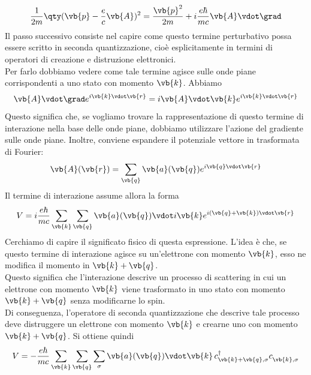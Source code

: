 \begin{equation*}
   \frac{1}{2m}
   \qty(
      \vb{p}
      -
      \frac{e}{c}\vb{A}
   )^2
   =
   \frac{\vb{p}^2}{2m}
   +
   i\frac{e\hbar}{mc}\vb{A}\vdot\grad
\end{equation*}
Il passo successivo consiste nel capire come questo termine perturbativo possa essere scritto in seconda quantizzazione, cioè esplicitamente in termini di operatori di creazione e distruzione elettronici.\\
Per farlo dobbiamo vedere come tale termine agisce sulle onde piane corrispondenti a uno stato con momento $\vb{k}$. Abbiamo
\begin{equation*}
   \vb{A}\vdot\grad
   e^{i\vb{k}\vdot\vb{r}}
   =
   i\vb{A}\vdot\vb{k}
   e^{i\vb{k}\vdot\vb{r}}
\end{equation*}
Questo significa che, se vogliamo trovare la rappresentazione di questo termine di interazione nella base delle onde piane, dobbiamo utilizzare l'azione del gradiente sulle onde piane. Inoltre, conviene espandere il potenziale vettore in trasformata di Fourier:
\begin{equation*}
   \vb{A}(\vb{r})
   =
   \sum_{\vb{q}}
   \vb{a}(\vb{q})
   e^{i\vb{q}\vdot\vb{r}}
\end{equation*}
Il termine di interazione assume allora la forma
\begin{equation*}
   V
   =
   i\frac{e \hbar}{mc}
   \sum_{\vb{k}}
   \sum_{\vb{q}}
   \vb{a}(\vb{q})
   \vdot
   i\vb{k}
   e^{i(\vb{q}+\vb{k})\vdot\vb{r}}
\end{equation*}
Cerchiamo di capire il significato fisico di questa espressione. L'idea è che, se questo termine di interazione agisce su un'elettrone con momento $\vb{k}$, esso ne modifica il momento in $\vb{k}+\vb{q}$.\\
Questo significa che l'interazione descrive un processo di scattering in cui un elettrone con momento $\vb{k}$ viene trasformato in uno stato con momento $\vb{k}+\vb{q}$ senza modificarne lo spin.\\
Di conseguenza, l'operatore di seconda quantizzazione che descrive tale processo deve distruggere un elettrone con momento $\vb{k}$ e crearne uno con momento $\vb{k}+\vb{q}$. Si ottiene quindi
\begin{equation*}
   V
   =
   -
   \frac{e \hbar}{mc}
   \sum_{\vb{k}}
   \sum_{\vb{q}}
   \sum_{\sigma}
   \vb{a}(\vb{q})
   \vdot
   \vb{k}
   \,
   c^{\dag}_{\vb{k}+\vb{q},\sigma}
   c^{\vphantom{\dag}}_{\vb{k},\sigma}
\end{equation*}
